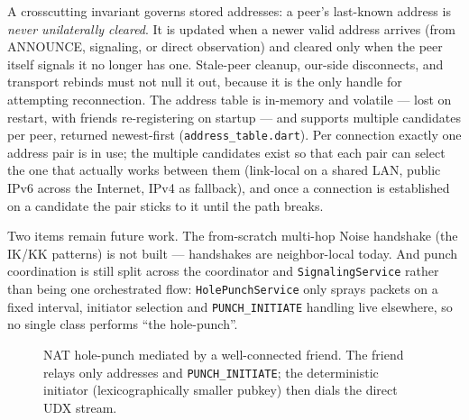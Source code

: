 \documentclass[11pt]{report}
\newcommand{\code}[1]{\texttt{\small #1}}
\begin{document}
A crosscutting invariant governs stored addresses: a peer's last-known address is \emph{never unilaterally cleared}. It is updated when a newer valid address arrives (from ANNOUNCE, signaling, or direct observation) and cleared only when the peer itself signals it no longer has one. Stale-peer cleanup, our-side disconnects, and transport rebinds must not null it out, because it is the only handle for attempting reconnection. The address table is in-memory and volatile --- lost on restart, with friends re-registering on startup --- and supports multiple candidates per peer, returned newest-first (\code{address\_table.dart}). Per connection exactly one address pair is in use; the multiple candidates exist so that each pair can select the one that actually works between them (link-local on a shared LAN, public IPv6 across the Internet, IPv4 as fallback), and once a connection is established on a candidate the pair sticks to it until the path breaks.

Two items remain future work. The from-scratch multi-hop Noise handshake (the IK/KK patterns) is not built --- handshakes are neighbor-local today. And punch coordination is still split across the coordinator and \code{SignalingService} rather than being one orchestrated flow: \code{HolePunchService} only sprays packets on a fixed interval, initiator selection and \code{PUNCH\_INITIATE} handling live elsewhere, so no single class performs ``the hole-punch''.


\begin{figure}[htbp]\centering
{}
\caption{NAT hole-punch mediated by a well-connected friend. The friend relays only addresses and \code{PUNCH\_INITIATE}; the deterministic initiator (lexicographically smaller pubkey) then dials the direct UDX stream.}
\label{fig:holepunch}
\end{figure}
\end{document}
